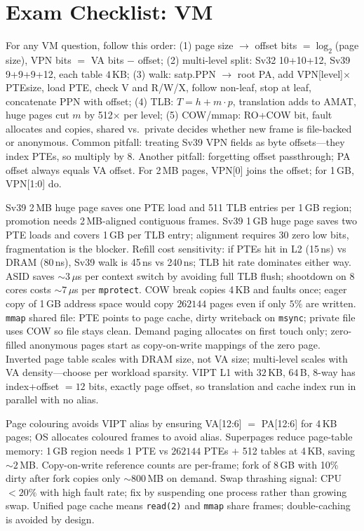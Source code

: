\section{Exam Checklist: VM}
For any VM question, follow this order:
(1) page size $\to$ offset bits $=\log_2$(page size), VPN bits $=$ VA bits $-$ offset;
(2) multi-level split: Sv32 10+10+12, Sv39 9+9+9+12, each table $4$\,KB;
(3) walk: satp.PPN $\to$ root PA, add VPN[level]$\times$PTEsize, load PTE, check V and R/W/X, follow non-leaf, stop at leaf, concatenate PPN with offset;
(4) TLB: $T = h + m\cdot p$, translation adds to AMAT, huge pages cut $m$ by 512$\times$ per level;
(5) COW/mmap: RO+COW bit, fault allocates and copies, shared vs.\ private decides whether new frame is file-backed or anonymous.
Common pitfall: treating Sv39 VPN fields as byte offsets---they index PTEs, so multiply by 8. Another pitfall: forgetting offset passthrough; PA offset always equals VA offset. For 2\,MB pages, VPN[0] joins the offset; for 1\,GB, VPN[1:0] do.

Sv39 2\,MB huge page saves one PTE load and 511 TLB entries per 1\,GB region; promotion needs 2\,MB-aligned contiguous frames.
Sv39 1\,GB huge page saves two PTE loads and covers 1\,GB per TLB entry; alignment requires 30 zero low bits, fragmentation is the blocker.
Refill cost sensitivity: if PTEs hit in L2 (15\,ns) vs DRAM (80\,ns), Sv39 walk is 45\,ns vs 240\,ns; TLB hit rate dominates either way.
ASID saves $\sim 3$\,$\mu$s per context switch by avoiding full TLB flush; shootdown on 8 cores costs $\sim 7$\,$\mu$s per \texttt{mprotect}.
COW break copies 4\,KB and faults once; eager copy of 1\,GB address space would copy $262144$ pages even if only $5\%$ are written.
\texttt{mmap} shared file: PTE points to page cache, dirty writeback on \texttt{msync}; private file uses COW so file stays clean.
Demand paging allocates on first touch only; zero-filled anonymous pages start as copy-on-write mappings of the zero page.
Inverted page table scales with DRAM size, not VA size; multi-level scales with VA density---choose per workload sparsity.
VIPT L1 with $32$\,KB, $64$\,B, 8-way has index+offset $=12$ bits, exactly page offset, so translation and cache index run in parallel with no alias.

Page colouring avoids VIPT alias by ensuring VA[12:6] $=$ PA[12:6] for 4\,KB pages; OS allocates coloured frames to avoid alias.
Superpages reduce page-table memory: 1\,GB region needs 1 PTE vs $262144$ PTEs $+$ 512 tables at 4\,KB, saving $\sim 2$\,MB.
Copy-on-write reference counts are per-frame; fork of 8\,GB with 10\% dirty after fork copies only $\sim 800$\,MB on demand.
Swap thrashing signal: CPU $<20\%$ with high fault rate; fix by suspending one process rather than growing swap.
Unified page cache means \texttt{read(2)} and \texttt{mmap} share frames; double-caching is avoided by design.

